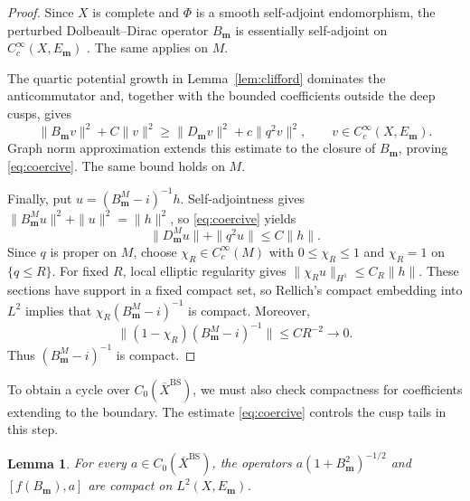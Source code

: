 \documentclass[11pt]{article}
\theoremstyle{definition}
\theoremstyle{plain}
\numberwithin{equation}{section}
\newtheorem{lemma}[theorem]{Lemma}
\newcommand{\BS}{\mathrm{BS}}
\begin{document}
\begin{proof}
Since $X$ is complete and $\Phi$ is a smooth self-adjoint
endomorphism, the perturbed Dolbeault--Dirac operator
$B_{\boldsymbol m}$ is essentially self-adjoint on
$C_c^\infty(X,E_{\boldsymbol m})$
\cite[Theorem~2.1 and \S2.6]{BravermanCecchini}.
The same applies on $M$.

The quartic potential growth in Lemma~\ref{lem:clifford}
dominates the anticommutator and, together with the bounded
coefficients outside the deep cusps, gives
\[
 \|B_{\boldsymbol m}v\|^2+C\|v\|^2
 \geq \|D_{\boldsymbol m}v\|^2+c\|q^2v\|^2,
 \qquad v\in C_c^\infty(X,E_{\boldsymbol m}).
\]
Graph norm approximation extends this estimate to the closure
of $B_{\boldsymbol m}$, proving \eqref{eq:coercive}.
The same bound holds on $M$.

Finally, put $u=(B_{\boldsymbol m}^M-i)^{-1}h$.
Self-adjointness gives
$\|B_{\boldsymbol m}^Mu\|^2+\|u\|^2=\|h\|^2$,
so \eqref{eq:coercive} yields
\[
 \|D_{\boldsymbol m}^Mu\|+\|q^2u\|\leq C\|h\|.
\]
Since $q$ is proper on $M$, choose
$\chi_R\in C_c^\infty(M)$ with $0\leq\chi_R\leq1$
and $\chi_R=1$ on $\{q\leq R\}$.
For fixed $R$, local elliptic regularity gives
$\|\chi_Ru\|_{H^1}\leq C_R\|h\|$.
These sections have support in a fixed compact set, so
Rellich's compact embedding into $L^2$ implies that
$\chi_R(B_{\boldsymbol m}^M-i)^{-1}$ is compact.
Moreover,
\[
 \|(1-\chi_R)(B_{\boldsymbol m}^M-i)^{-1}\|
 \leq CR^{-2}\longrightarrow0.
\]
Thus $(B_{\boldsymbol m}^M-i)^{-1}$ is compact.
\end{proof}

To obtain a cycle over $C_0(\overline X^{\BS})$, we must also check
compactness for coefficients extending to the boundary. The estimate \eqref{eq:coercive} controls the cusp tails in this step.

\begin{lemma}\label{lem:bs-local}
For every $a\in C_0(\overline X^{\BS})$, the operators
$a(1+B_{\boldsymbol m}^2)^{-1/2}$ and $[f(B_{\boldsymbol m}),a]$
are compact on $L^2(X,E_{\boldsymbol m})$.
\end{lemma}
\end{document}
